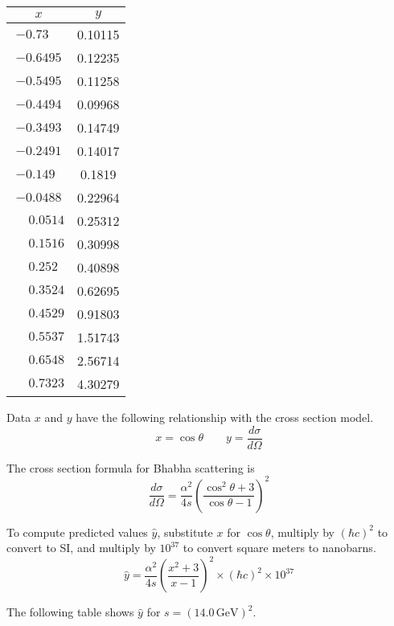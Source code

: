\documentclass[12pt]{article}
\begin{document}
\begin{center}
\begin{tabular}{|c|c|}
\hline
$x$ & $y$\\
\hline
$-0.73\phantom{00}$ & 0.10115\\
$-0.6495$ & 0.12235\\
$-0.5495$ & 0.11258\\
$-0.4494$ & 0.09968\\
$-0.3493$ & 0.14749\\
$-0.2491$ & 0.14017\\
$-0.149\phantom{0}$ & 0.1819\phantom{0}\\
$-0.0488$ & 0.22964\\
$\phantom{+}0.0514$ & 0.25312\\
$\phantom{+}0.1516$ & 0.30998\\
$\phantom{+}0.252\phantom{0}$ & 0.40898\\
$\phantom{+}0.3524$ & 0.62695\\
$\phantom{+}0.4529$ & 0.91803\\
$\phantom{+}0.5537$ & 1.51743\\
$\phantom{+}0.6548$ & 2.56714\\
$\phantom{+}0.7323$ & 4.30279\\
\hline
\end{tabular}
\end{center}

\noindent
Data $x$ and $y$ have the following relationship
with the cross section model.
\begin{equation*}
x=\cos\theta
\qquad
y=\frac{d\sigma}{d\Omega}
\end{equation*}

\noindent
The cross section formula for Bhabha scattering is
\begin{equation*}
\frac{d\sigma}{d\Omega}
=\frac{\alpha^2}{4s}
\left(\frac{\cos^2\theta+3}{\cos\theta-1}\right)^2
\end{equation*}

\noindent
To compute predicted values $\hat{y}$,
substitute $x$ for $\cos\theta$,
multiply by $(\hbar c)^2$ to convert to SI,
and multiply by $10^{37}$ to convert square meters to nanobarns.
\begin{equation*}
\hat{y}
=\frac{\alpha^2}{4s}
\left(\frac{x^2+3}{x-1}\right)^2
\times(\hbar c)^2
\times10^{37}
\end{equation*}

\noindent
The following table shows $\hat{y}$ for $s=(14.0\,\text{GeV})^2$.
\end{document}
